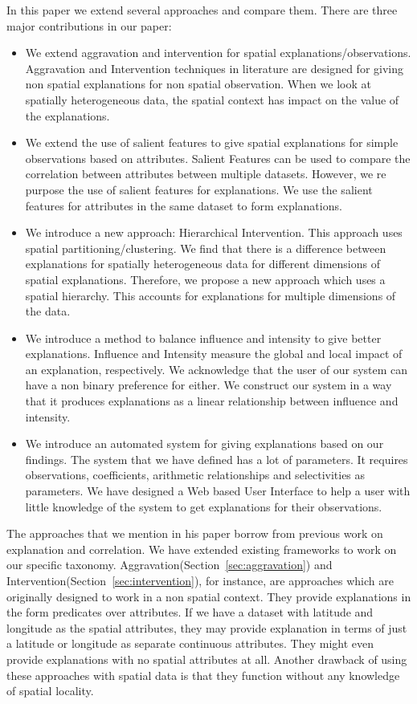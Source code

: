 In this paper we extend several approaches and compare them. There are three major contributions in our paper:
\begin{itemize}

\item We extend aggravation and intervention for spatial explanations/observations. Aggravation and Intervention techniques in literature are designed for giving non spatial explanations for non spatial observation. When we look at spatially heterogeneous data, the spatial context has impact on the value of the explanations.

\item We extend the use of salient features to give spatial explanations for simple observations based on attributes. Salient Features can be used to compare the correlation between attributes between multiple datasets. However, we re purpose the use of salient features for explanations. We use the salient features for attributes in the same dataset to form explanations.
\item We introduce a new approach: Hierarchical Intervention. This approach uses spatial partitioning/clustering. We find that there is a difference between explanations for spatially heterogeneous data for different dimensions of spatial explanations. Therefore, we propose a new approach which uses a spatial hierarchy. This accounts for explanations for multiple dimensions of the data.

\item We introduce a method to balance influence and intensity to give better explanations. Influence and Intensity measure the global and local impact of an explanation, respectively. We acknowledge that the user of our system can have a non binary preference for either. We construct our system in a way that it produces explanations as  a linear relationship between influence and intensity.

\item We introduce an automated system for giving explanations based on our findings. The system that we have defined has a lot of parameters. It requires observations, coefficients, arithmetic relationships and selectivities as parameters. We have designed a Web based User Interface to help a user with little knowledge of the system to get explanations for their observations.
\end{itemize}

The approaches that we mention in his paper borrow from previous work on explanation and correlation. We have extended existing frameworks to work on our specific taxonomy. Aggravation(Section~\ref{sec:aggravation}) and Intervention(Section~\ref{sec:intervention}), for instance, are approaches which are originally designed to work in a non spatial context. They provide explanations in the form predicates over attributes. If we have a dataset with latitude and longitude as the spatial attributes, they may provide explanation in terms of just a latitude or longitude as separate continuous attributes. They might even provide explanations with no spatial attributes at all. Another drawback of using these approaches with spatial data is that they function without any knowledge of spatial locality.

